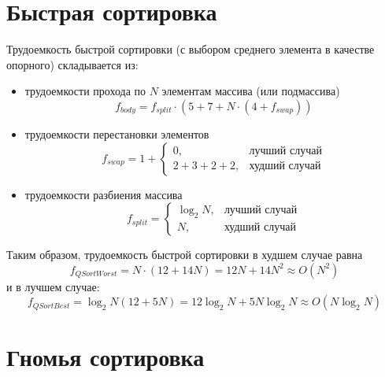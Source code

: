 \section{Быстрая сортировка}

Трудоемкость быстрой сортировки (с выбором среднего элемента в качестве опорного) складывается из:
\begin{itemize}
    \item трудоемкости прохода по $N$ элементам массива (или подмассива)
    \begin{equation}
        f_{body} = f_{split} \cdot (5 + 7 + N \cdot (4 + f_{swap}))
    \end{equation}
    \item трудоемкости перестановки элементов
    \begin{equation}
        f_{swap} = 1 + 
        \begin{cases}
            0, & \text{лучший случай}\\
            2 + 3 + 2 + 2, & \text{худший случай}
        \end{cases}
    \end{equation}
    \item трудоемкости разбиения массива
    \begin{equation}
        f_{split} = 
        \begin{cases}
            \log_2{N}, & \text{лучший случай} \\
            N, & \text{худший случай}
        \end{cases}
    \end{equation}
\end{itemize}

Таким образом, трудоемкость быстрой сортировки в худшем случае равна
\begin{equation}
    f_{QSortWorst} = N \cdot (12 + 14N) = 12N + 14N^2 \approx O(N^2)
\end{equation}
и в лучшем случае:
\begin{equation}
    f_{QSortBest} = \log_2{N} (12 + 5N) = 12\log_2{N} + 5N\log_2{N} \approx O(N\log_2{N})
\end{equation}

\section{Гномья сортировка}

